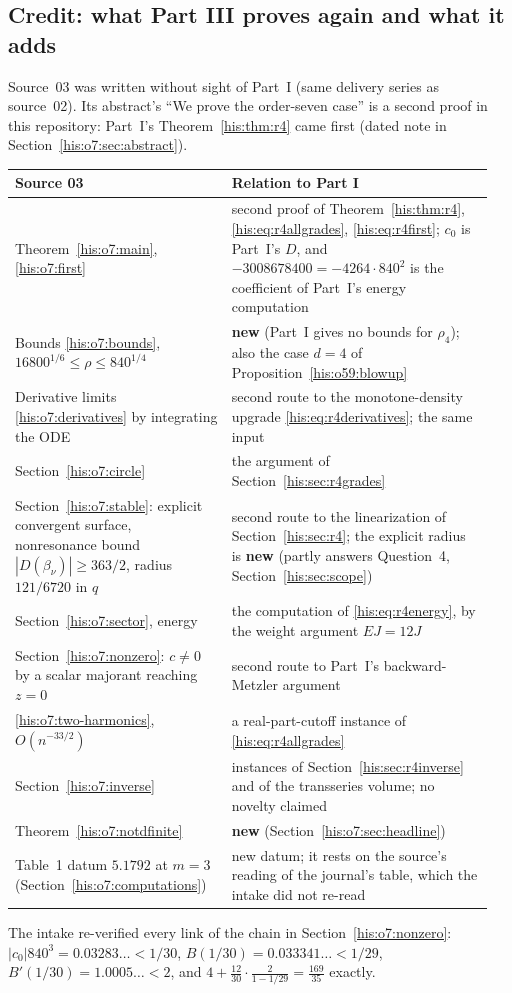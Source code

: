 \documentclass[11pt]{article}
\theoremstyle{remark}\newtheorem{remark}[theorem]{Remark}
\numberwithin{equation}{section}
\begin{document}
\subsection{Credit: what Part III proves again and what it adds}\label{his:o7:sec:map}
Source~03 was written without sight of Part~I (same delivery series as source~02). Its abstract's ``We prove the order-seven case'' is a second proof in this repository: Part~I's Theorem~\ref{his:thm:r4} came first (dated note in Section~\ref{his:o7:sec:abstract}).
\begin{center}\small
\begin{tabular}{@{}>{\raggedright\arraybackslash}p{0.43\linewidth}>{\raggedright\arraybackslash}p{0.52\linewidth}@{}}
\toprule
Source 03 & Relation to Part I\\
\midrule
Theorem~\ref{his:o7:main}, \eqref{his:o7:first} & second proof of Theorem~\ref{his:thm:r4}, \eqref{his:eq:r4allgrades}, \eqref{his:eq:r4first}; $c_0$ is Part~I's $D$, and $-3008678400=-4264\cdot840^2$ is the coefficient of Part~I's energy computation\\
Bounds \eqref{his:o7:bounds}, $16800^{1/6}\le\rho\le840^{1/4}$ & \textbf{new} (Part~I gives no bounds for $\rho_4$); also the case $d=4$ of Proposition~\ref{his:o59:blowup}\\
Derivative limits \eqref{his:o7:derivatives} by integrating the ODE & second route to the monotone-density upgrade \eqref{his:eq:r4derivatives}; the same input \cite{astashova2013}\\
Section~\ref{his:o7:circle} & the argument of Section~\ref{his:sec:r4grades}\\
Section~\ref{his:o7:stable}: explicit convergent surface, nonresonance bound $|D(\beta_\nu)|\ge363/2$, radius $121/6720$ in $q$ & second route to the linearization of Section~\ref{his:sec:r4}; the explicit radius is \textbf{new} (partly answers Question~4, Section~\ref{his:sec:scope})\\
Section~\ref{his:o7:sector}, energy & the computation of \eqref{his:eq:r4energy}, by the weight argument $EJ=12J$\\
Section~\ref{his:o7:nonzero}: $c\ne0$ by a scalar majorant reaching $z=0$ & second route to Part~I's backward-Metzler argument\\
\eqref{his:o7:two-harmonics}, $O(n^{-33/2})$ & a real-part-cutoff instance of \eqref{his:eq:r4allgrades}\\
Section~\ref{his:o7:inverse} & instances of Section~\ref{his:sec:r4inverse} and of the transseries volume; no novelty claimed\\
Theorem~\ref{his:o7:notdfinite} & \textbf{new} (Section~\ref{his:o7:sec:headline})\\
Table~1 datum $5.1792$ at $m=3$ (Section~\ref{his:o7:computations}) & new datum; it rests on the source's reading of the journal's table, which the intake did not re-read\\
\bottomrule
\end{tabular}
\end{center}
The intake re-verified every link of the chain in Section~\ref{his:o7:nonzero}: $|c_0|840^3=0.03283\ldots<1/30$, $B(1/30)=0.033341\ldots<1/29$, $B'(1/30)=1.0005\ldots<2$, and $4+\tfrac{12}{30}\cdot\tfrac{2}{1-1/29}=\tfrac{169}{35}$ exactly.
\end{document}
